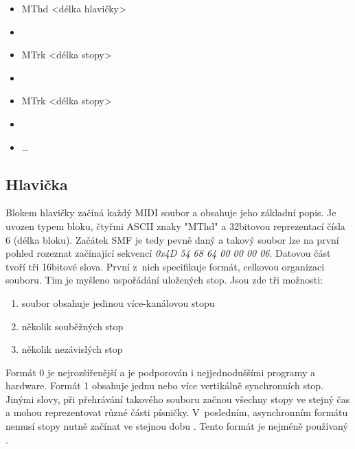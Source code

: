 \begin{itemize} [label={}]
    \item MThd <délka hlavičky>
    \item <data hlavičky>
    \item MTrk <délka stopy>
    \item <data stopy>
    \item MTrk <délka stopy>
    \item <data stopy>
    \item \dots
\end{itemize}

\subsection{Hlavička}
Blokem hlavičky začíná každý MIDI soubor a obsahuje jeho základní popis.
Je uvozen typem bloku, čtyřmi ASCII znaky "MThd" 
a 32bitovou reprezentací čísla 6 (délka bloku). 
Začátek SMF je tedy pevně daný a takový soubor lze na první pohled rozeznat začínající sekvencí 
\emph{0x4D 54 68 64 00 00 00 06}. 
Datovou část tvoří tři 16bitové slova.
První z~nich specifikuje formát, celkovou organizaci souboru.
Tím je myšleno uspořádání uložených stop.
Jsou zde tři možnosti:

\begin{enumerate}\addtocounter{enumi}{-1}
    \item soubor obsahuje jedinou více-kanálovou stopu
    \item několik souběžných stop
    \item několik nezávislých stop
\end{enumerate}

Formát 0 je nejrozšířenější a je podporován i nejjednoduššími programy 
a hardware.
\cite{Back_SMF_Specif}
Formát 1 obsahuje jednu nebo více vertikálně synchronních stop.
Jinými slovy, při přehrávání takového souboru 
začnou všechny stopy ve stejný čas 
a mohou reprezentovat různé části písničky.
V~posledním, asynchronním formátu nemusí stopy nutně začínat ve stejnou dobu
\cite{Glatt_aboutMIDIFiles}.
Tento formát je nejméně používaný
\cite{MIDI_tutorials}.
\par

